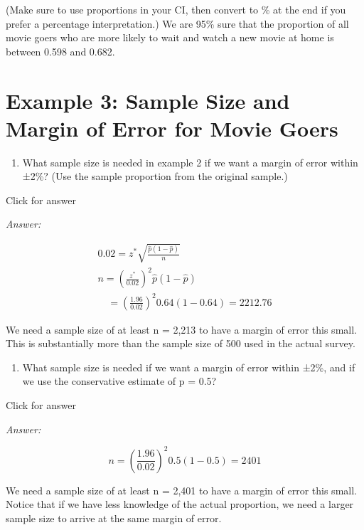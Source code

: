 \documentclass[
]{book}
\providecommand{\tightlist}{%
  \setlength{\itemsep}{0pt}\setlength{\parskip}{0pt}}
\begin{document}
(Make sure to use proportions in your CI, then convert to \% at the end if you prefer a percentage interpretation.) We are 95\% sure that the proportion of all movie goers who are more likely to wait and watch a new movie at home is between 0.598 and 0.682.

\hypertarget{example-3-sample-size-and-margin-of-error-for-movie-goers}{%
\section{Example 3: Sample Size and Margin of Error for Movie Goers}\label{example-3-sample-size-and-margin-of-error-for-movie-goers}}

\begin{enumerate}
\def\labelenumi{(\alph{enumi})}
\tightlist
\item
  What sample size is needed in example 2 if we want a margin of error within ±2\%? (Use the sample proportion from the original sample.)
\end{enumerate}

Click for answer

\emph{Answer:}

\[\begin{array}{l}
0.02=z^{*} \sqrt{\frac{\hat{p}(1-\hat{p})}{n}} \\
n=\left(\frac{z^{*}}{0.02}\right)^{2} \hat{p}(1-\hat{p})\\\quad =\left(\frac{1.96}{0.02}\right)^{2} 0.64(1-0.64)=2212.76
\end{array}\]

We need a sample size of at least n = 2,213 to have a margin of error this small. This is substantially more than the sample size of 500 used in the actual survey.

\begin{enumerate}
\def\labelenumi{(\alph{enumi})}
\setcounter{enumi}{1}
\tightlist
\item
  What sample size is needed if we want a margin of error within ±2\%, and if we use the conservative estimate of p = 0.5?
\end{enumerate}

Click for answer

\emph{Answer:}

\[n=\left(\frac{1.96}{0.02}\right)^{2} 0.5(1-0.5)=2401\]

We need a sample size of at least n = 2,401 to have a margin of error this small. Notice that if we have less knowledge of the actual proportion, we need a larger sample size to arrive at the same margin of error.
\end{document}
